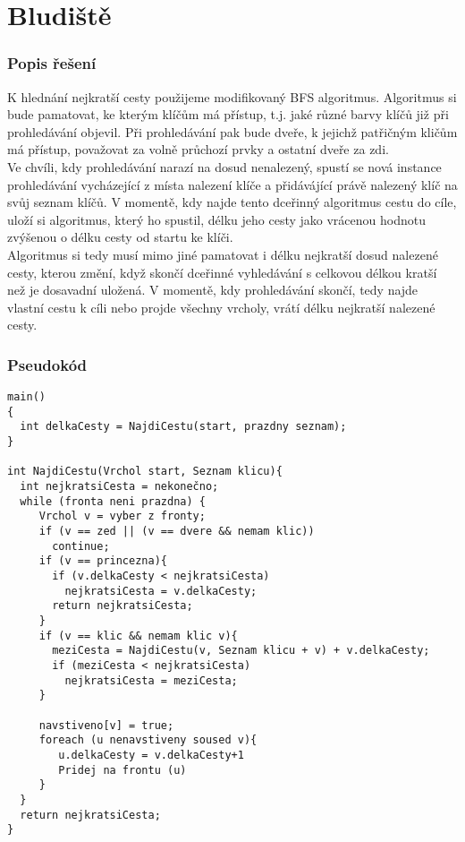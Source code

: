 \documentclass[11pt,a4paper]{article}
\begin{document}
\part*{Bludiště}
\section{Popis řešení}
K hlednání nejkratší cesty použijeme modifikovaný BFS algoritmus. Algoritmus si bude pamatovat, ke kterým klíčům má přístup, t.j. jaké různé barvy klíčů již při prohledávání objevil. Při prohledávání pak bude dveře, k jejichž patřičným kličům má přístup, považovat za volně průchozí prvky a ostatní dveře za zdi.\\

Ve chvíli, kdy prohledávání narazí na dosud nenalezený, spustí se nová instance prohledávání vycházející z místa nalezení klíče a přidávájící právě nalezený klíč na svůj seznam klíčů. V momentě, kdy najde tento dceřinný algoritmus cestu do cíle, uloží si algoritmus, který ho spustil, délku jeho cesty jako vrácenou hodnotu zvýšenou o délku cesty od startu ke klíči.\\

Algoritmus si tedy musí mimo jiné pamatovat i délku nejkratší dosud nalezené cesty, kterou změní, když skončí dceřinné vyhledávání s celkovou délkou kratší než je dosavadní uložená. V momentě, kdy prohledávání skončí, tedy najde vlastní cestu k cíli nebo projde všechny vrcholy, vrátí délku nejkratší nalezené cesty.
 
\section{Pseudokód}
\begin{verbatim}
main()
{
  int delkaCesty = NajdiCestu(start, prazdny seznam);
}	

int NajdiCestu(Vrchol start, Seznam klicu){
  int nejkratsiCesta = nekonečno;  
  while (fronta neni prazdna) {
     Vrchol v = vyber z fronty;
     if (v == zed || (v == dvere && nemam klic))
       continue;
     if (v == princezna){
       if (v.delkaCesty < nejkratsiCesta)
         nejkratsiCesta = v.delkaCesty;
       return nejkratsiCesta;
     }
     if (v == klic && nemam klic v){
       meziCesta = NajdiCestu(v, Seznam klicu + v) + v.delkaCesty;
       if (meziCesta < nejkratsiCesta)
         nejkratsiCesta = meziCesta;
     }
     
     navstiveno[v] = true;
     foreach (u nenavstiveny soused v){
        u.delkaCesty = v.delkaCesty+1
        Pridej na frontu (u)	 
     }     
  }
  return nejkratsiCesta;
}
\end{verbatim}
\end{document}
